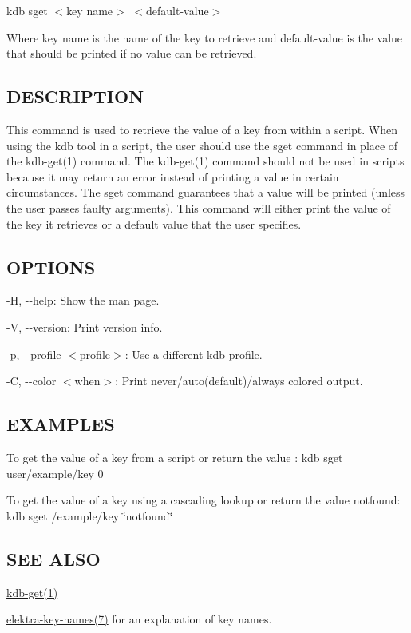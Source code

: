 {\ttfamily kdb sget $<$key name$>$ $<$default-\/value$>$}

Where {\ttfamily key name} is the name of the key to retrieve and {\ttfamily default-\/value} is the value that should be printed if no value can be retrieved.

\subsection*{D\+E\+S\+C\+R\+I\+P\+T\+I\+ON}

This command is used to retrieve the value of a key from within a script. When using the kdb tool in a script, the user should use the {\ttfamily sget} command in place of the kdb-\/get(1) command. The kdb-\/get(1) command should not be used in scripts because it may return an error instead of printing a value in certain circumstances. The {\ttfamily sget} command guarantees that a value will be printed (unless the user passes faulty arguments). This command will either print the value of the key it retrieves or a default value that the user specifies.

\subsection*{O\+P\+T\+I\+O\+NS}


\begin{DoxyItemize}
\item {\ttfamily -\/H}, {\ttfamily -\/-\/help}\+: Show the man page.
\item {\ttfamily -\/V}, {\ttfamily -\/-\/version}\+: Print version info.
\item {\ttfamily -\/p}, {\ttfamily -\/-\/profile $<$profile$>$}\+: Use a different kdb profile.
\item {\ttfamily -\/C}, {\ttfamily -\/-\/color $<$when$>$}\+: Print never/auto(default)/always colored output.
\end{DoxyItemize}

\subsection*{E\+X\+A\+M\+P\+L\+ES}

To get the value of a key from a script or return the value {}\+: {\ttfamily kdb sget user/example/key 0}

To get the value of a key using a cascading lookup or return the value {\ttfamily notfound}\+: {\ttfamily kdb sget /example/key \char`\"{}notfound\char`\"{}}

\subsection*{S\+EE A\+L\+SO}


\begin{DoxyItemize}
\item \hyperlink{md_doc_help_kdb-get_doc_help_kdb-get_md}{kdb-\/get(1)}
\item \hyperlink{md_doc_help_elektra-key-names_doc_help_elektra-key-names_md}{elektra-\/key-\/names(7)} for an explanation of key names. 
\end{DoxyItemize}
